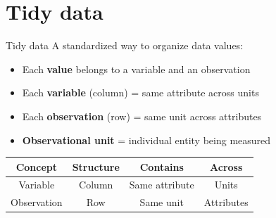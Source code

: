 \section{Tidy data}

\begin{frame}{Tidy data}
  A standardized way to organize data values:
  \begin{itemize}
    \item Each \textbf{value} belongs to a variable and an observation
    \item Each \textbf{variable} (column) = same attribute across units
    \item Each \textbf{observation} (row) = same unit across attributes
    \item \textbf{Observational unit} = individual entity being measured
  \end{itemize}

  \vspace{0.3cm}
  \centering
  \small
  \begin{tabular}{cccc}
    \toprule
    \textbf{Concept} & \textbf{Structure} & \textbf{Contains} & \textbf{Across} \\
    \midrule
    Variable & Column & Same attribute & Units \\
    Observation & Row & Same unit & Attributes \\
    \bottomrule
  \end{tabular}
\end{frame}

